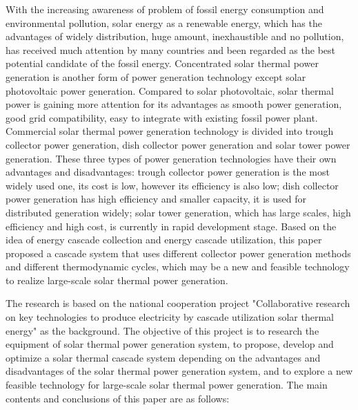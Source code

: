 \enabstract
{
    With the increasing awareness of problem of fossil energy consumption and environmental pollution, solar energy as a renewable energy, which has the advantages of widely distribution, huge amount, inexhaustible and no pollution, has received much attention by many countries and been regarded as the best potential candidate of the fossil energy. Concentrated solar thermal power generation is another form of power generation technology except solar photovoltaic power generation. Compared to solar photovoltaic, solar thermal power is gaining more attention for its advantages as smooth power generation, good grid compatibility, easy to integrate with existing fossil power plant.
    Commercial solar thermal power generation technology is divided into trough collector power generation, dish collector power generation and solar tower power generation. These three types of power generation technologies have their own advantages and disadvantages: trough collector power generation is the most widely used one, its cost is low, however its efficiency is also low; dish collector power generation has high efficiency and smaller capacity, it is used for distributed generation widely; solar tower generation, which has large scales, high efficiency and high cost, is currently in rapid development stage. Based on the idea of ​​energy cascade collection and energy cascade utilization, this paper proposed a cascade system that uses different collector power generation methods and different thermodynamic cycles, which may be a new and feasible technology to realize large-scale solar thermal power generation.

    The research is based on the national cooperation project "Collaborative research on key technologies to produce electricity by cascade utilization solar thermal energy" as the background. The objective of this project is to research the equipment of solar thermal power generation system, to propose, develop and optimize a solar thermal cascade system depending on the advantages and disadvantages of the solar thermal power generation system, and to explore a new feasible technology for large-scale solar thermal power generation. The main contents and conclusions of this paper are as follows:

}
